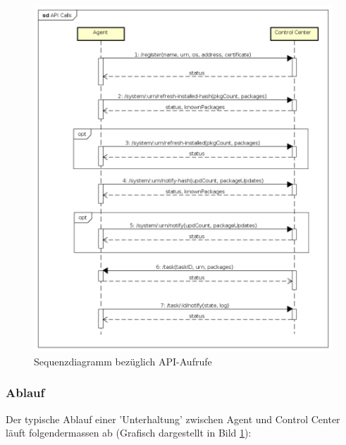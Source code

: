\begin{figure}
  \centering
    \includegraphics[width=\textwidth]{files/API_Calls}
  \caption{Sequenzdiagramm bezüglich API-Aufrufe}
  \label{fig:api_sequence_diagram}
\end{figure}

\subsubsection*{Ablauf}

Der typische Ablauf einer 'Unterhaltung' zwischen Agent und Control Center läuft folgendermassen ab (Grafisch dargestellt in Bild \ref{fig:api_sequence_diagram}):

